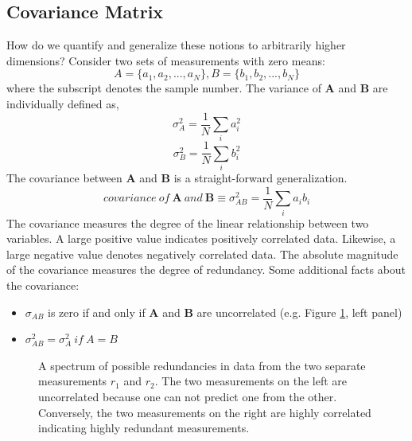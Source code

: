 \subsection{Covariance Matrix}
How do we quantify and generalize these notions to arbitrarily higher dimensions? Consider two sets of measurements with zero means:
$$A = \{a_1,a_2,...,a_N\} , B = \{b_1,b_2,...,b_N\}$$
where the subscript denotes the sample number. The variance
of $\pmb{A}$ and $\pmb{B}$ are individually defined as,
$$\sigma_A^2 = \dfrac{1}{N}\sum_i a_i^2$$
$$\sigma_B^2 = \dfrac{1}{N}\sum_i b_i^2$$
The covariance between  $\pmb{A}$ and $\pmb{B}$ is a straight-forward generalization.
$$covariance\ of\ \pmb{A}\ and\ \pmb{B} \equiv \sigma_{AB}^2 = \dfrac{1}{N}\sum
_i a_ib_i$$
The covariance measures the degree of the linear relationship between two variables. A large positive value indicates positively correlated data. Likewise, a large negative value denotes negatively correlated data. The absolute magnitude of the covariance measures the degree of redundancy. Some additional facts about the covariance:
\begin{itemize}
\item
$\sigma_{AB}$ is zero if and only if $\pmb{A}$ and $\pmb{B}$ are uncorrelated (e.g. Figure \ref{corel}, left panel)
\item
$\sigma^2_{AB} = \sigma^2_A\ if\ A = B$
\end{itemize}


\begin{figure}[!htbp]
\centering
{}
\caption{A spectrum of possible redundancies in data from the two separate measurements $r_1$ and $r_2$. The two measurements on the left are uncorrelated because one can not predict one from the other. Conversely, the two measurements on the right are highly correlated indicating highly redundant measurements.}
\label{corel}
\end{figure}

